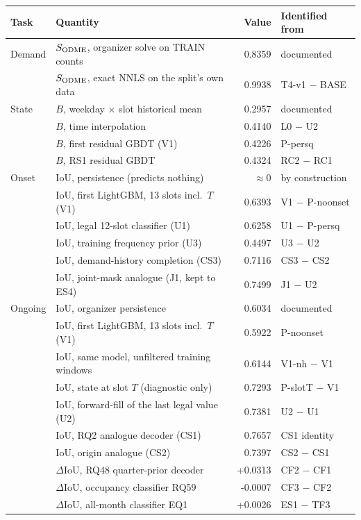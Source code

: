 \begin{tabular}{@{}l l r l@{}}
\toprule
Task & Quantity & Value & Identified from \\
\midrule
Demand & $S_{\mathrm{ODME}}$, organizer solve on TRAIN counts & 0.8359 & documented \\
 & $S_{\mathrm{ODME}}$, exact NNLS on the split's own data & 0.9938 & T4-v1 $-$ BASE \\
\addlinespace[2pt]
State & $B$, weekday $\times$ slot historical mean & 0.2957 & documented \\
 & $B$, time interpolation & 0.4140 & L0 $-$ U2 \\
 & $B$, first residual GBDT (V1) & 0.4226 & P-persq \\
 & $B$, RS1 residual GBDT & 0.4324 & RC2 $-$ RC1 \\
\addlinespace[2pt]
Onset & IoU, persistence (predicts nothing) & $\approx 0$ & by construction \\
 & IoU, first LightGBM, 13 slots incl.\ $T$ (V1) & 0.6393 & V1 $-$ P-noonset \\
 & IoU, legal 12-slot classifier (U1) & 0.6258 & U1 $-$ P-persq \\
 & IoU, training frequency prior (U3) & 0.4497 & U3 $-$ U2 \\
 & IoU, demand-history completion (CS3) & 0.7116 & CS3 $-$ CS2 \\
 & IoU, joint-mask analogue (J1, kept to ES4) & 0.7499 & J1 $-$ U2 \\
\addlinespace[2pt]
Ongoing & IoU, organizer persistence & 0.6034 & documented \\
 & IoU, first LightGBM, 13 slots incl.\ $T$ (V1) & 0.5922 & P-noonset \\
 & IoU, same model, unfiltered training windows & 0.6144 & V1-nh $-$ V1 \\
 & IoU, state at slot $T$ (diagnostic only) & 0.7293 & P-slotT $-$ V1 \\
 & IoU, forward-fill of the last legal value (U2) & 0.7381 & U2 $-$ U1 \\
 & IoU, RQ2 analogue decoder (CS1) & 0.7657 & CS1 identity \\
 & IoU, origin analogue (CS2) & 0.7397 & CS2 $-$ CS1 \\
 & $\Delta$IoU, RQ48 quarter-prior decoder & +0.0313 & CF2 $-$ CF1 \\
 & $\Delta$IoU, occupancy classifier RQ59 & -0.0007 & CF3 $-$ CF2 \\
 & $\Delta$IoU, all-month classifier EQ1 & +0.0026 & ES1 $-$ TF3 \\
\bottomrule
\end{tabular}
